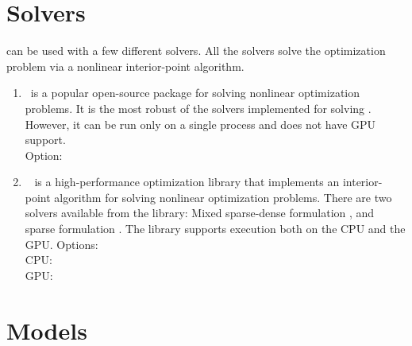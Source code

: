 \begin{comment}
\subssubection{Voltage magnitude for cartesian coordinates}
When using cartesian coordinates for voltages, inequality constraints (\ref{eq:opflow_ineq_vmag}) need to introduced to constraining the voltage magnitude within its bounds
\begin{equation}
  {\vmini}^2 \le {\vreali}^2 + {\vimagi}^2 \le {\vmaxi}^2,~~\iinJbus
\label{eq:opflow_ineq_vmag}
\end{equation}
\end{comment}

\section{Solvers}\label{sec:opflow_solvers}
\opflow can be used with a few different solvers. All the solvers solve the optimization problem via a nonlinear interior-point algorithm.
\begin{enumerate}
  \item \ipopt~is a popular open-source package for solving nonlinear optimization problems. It is the most robust of the solvers implemented for solving \opflow. However, it can be run only on a single process and does not have GPU support. \\ Option:
   

  \item \hiop~ is a high-performance optimization library that implements an interior-point algorithm for solving nonlinear optimization problems. There are two solvers available from the \hiop library: Mixed sparse-dense formulation {}, and sparse formulation {}. The library supports execution both on the CPU and the GPU. Options: \\ CPU: {} {} {} \\ GPU:  {} {} 

\end{enumerate}

\section{Models}\label{sec:opflow_model}

